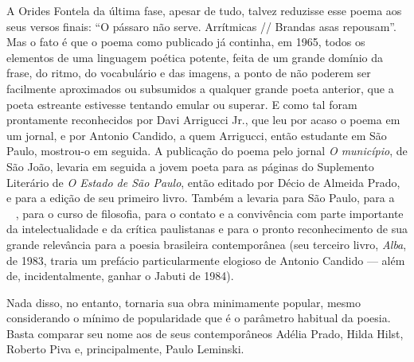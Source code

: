 A Orides Fontela da última fase, apesar de tudo, talvez reduzisse esse
poema aos seus versos ﬁnais: ``O pássaro não serve. Arrítmicas //
Brandas asas repousam''. Mas o fato é que o poema como publicado já
continha, em 1965, todos os elementos de uma linguagem poética potente, feita de um
grande domínio da frase, do ritmo, do vocabulário e das imagens, a ponto
de não poderem ser facilmente aproximados ou subsumidos a qualquer
grande poeta anterior, que a poeta estreante estivesse tentando emular
ou superar. E como tal foram prontamente reconhecidos por Davi Arrigucci
Jr., que leu por acaso o poema em um jornal, e por Antonio Candido, a
quem Arrigucci, então estudante em São Paulo, mostrou-o em seguida. A
publicação do poema pelo jornal \emph{O município}, de São João, levaria
em seguida a jovem poeta para as páginas do Suplemento Literário de
\emph{O Estado de São Paulo}, então editado por Décio de Almeida Prado,
e para a edição de seu primeiro livro. Também a levaria para São Paulo,
para a , para o curso de ﬁlosoﬁa, para o contato e a convivência com
parte importante da intelectualidade e da crítica paulistanas e para o
pronto reconhecimento de sua grande relevância para a poesia brasileira
contemporânea (seu terceiro livro, \emph{Alba}, de 1983, traria um
prefácio particularmente elogioso de Antonio Candido --- além de,
incidentalmente, ganhar o Jabuti de 1984).

Nada disso, no entanto, tornaria sua obra minimamente popular, mesmo
considerando o mínimo de popularidade que é o parâmetro habitual da
poesia. Basta comparar seu nome aos de seus contemporâneos Adélia Prado,
Hilda Hilst, Roberto Piva e, principalmente, Paulo Leminski.

